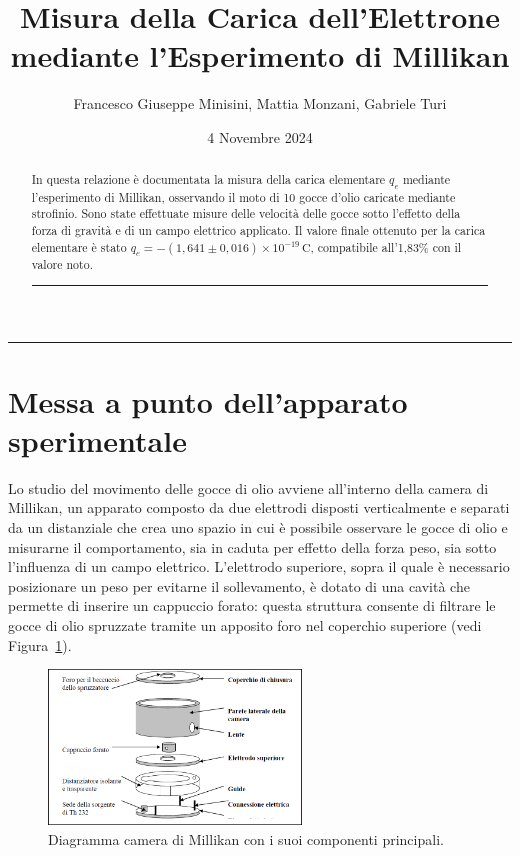 \documentclass[a4paper,12pt]{article}
\title{Misura della Carica dell'Elettrone mediante l'Esperimento di Millikan}
\author{Francesco Giuseppe Minisini, Mattia Monzani, Gabriele Turi}
\date{4 Novembre 2024}
\begin{document}
\maketitle
\hrule
\vspace{9pt}
\begin{abstract}
    \noindent
    In questa relazione è documentata la misura della carica elementare \( q_e \) mediante l'esperimento di Millikan, osservando il moto di 10 gocce d'olio caricate mediante strofinio. Sono state effettuate misure delle velocità delle gocce sotto l'effetto della forza di gravità e di un campo elettrico applicato. Il valore finale ottenuto per la carica elementare è stato \( q_e = -(1,641 \pm 0,016) \times 10^{-19} \, \mathrm{C} \), compatibile all'1,83\% con il valore noto.
\vspace{20 pt}
\hrule
\end{abstract}
\vspace{2 pt}


\section{Messa a punto dell'apparato sperimentale}

Lo studio del movimento delle gocce di olio avviene all'interno della camera di Millikan, un apparato composto da due elettrodi disposti verticalmente e separati da un distanziale che crea uno spazio in cui è possibile osservare le gocce di olio e misurarne il comportamento, sia in caduta per effetto della forza peso, sia sotto l'influenza di un campo elettrico. L'elettrodo superiore, sopra il quale è necessario posizionare un peso per evitarne il sollevamento, è dotato di una cavità che permette di inserire un cappuccio forato: questa struttura consente di filtrare le gocce di olio spruzzate tramite un apposito foro nel coperchio superiore (vedi Figura~\ref{fig:camera_millikan}).

\begin{figure}[H]
    \centering
    \includegraphics[width=0.6\textwidth]{Apparato2.png}
    \caption{Diagramma camera di Millikan con i suoi componenti principali.}
    \label{fig:camera_millikan}
\end{figure}
\end{document}
